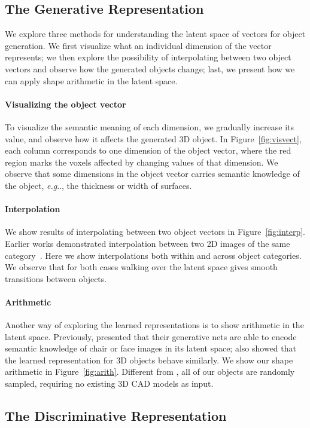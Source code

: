 \documentclass{article}
\makeatletter
\newcommand{\fig}[1]{Figure~\ref{#1}}
\DeclareRobustCommand\onedot{\futurelet\@let@token\@onedot}
\def\@onedot{\ifx\@let@token.\else.\null\fi\xspace}
\def\eg{\emph{e.g}\onedot} \def\Eg{\emph{E.g}\onedot}
\newcommand{\myparagraph}[1]{\vspace{-10pt}\paragraph{#1}}
\newcommand{\presubsection}{\vspace{-8pt}}
\newcommand{\postsubsection}{\vspace{-6pt}}
\makeatother
\begin{document}
\presubsection
\subsection{The Generative Representation}
\label{sec:vector}
\postsubsection

We explore three methods for understanding the latent space of vectors for object generation. We first visualize what an individual dimension of the vector represents; we then explore the possibility of interpolating between two object vectors and observe how the generated objects change; last, we present how we can apply shape arithmetic in the latent space.

\myparagraph{Visualizing the object vector} 
To visualize the semantic meaning of each dimension, we gradually increase its value, and observe how it affects the generated 3D object. In \fig{fig:visvect}, each column corresponds to one dimension of the object vector, where the red region marks the voxels affected by changing values of that dimension. We observe that some dimensions in the object vector carries semantic knowledge of the object, \eg, the thickness or width of surfaces. 

\myparagraph{Interpolation} We show results of interpolating between two object vectors in \fig{fig:interp}. Earlier works demonstrated interpolation between two 2D images of the same category~\citep{dosovitskiy2015learning,radford2016unsupervised}. Here we show interpolations both within and across object categories. We observe that for both cases walking over the latent space gives smooth transitions between objects.

\myparagraph{Arithmetic} Another way of exploring the learned representations is to show arithmetic in the latent space. Previously, \cite{dosovitskiy2015learning,radford2016unsupervised} presented that their generative nets are able to encode semantic knowledge of chair or face images in its latent space; \cite{girdhar2016learning} also showed that the learned representation for 3D objects behave similarly. We show our shape arithmetic in \fig{fig:arith}. Different from \cite{girdhar2016learning}, all of our objects are randomly sampled, requiring no existing 3D CAD models as input.

\presubsection
\subsection{The Discriminative Representation}
\postsubsection
\end{document}
